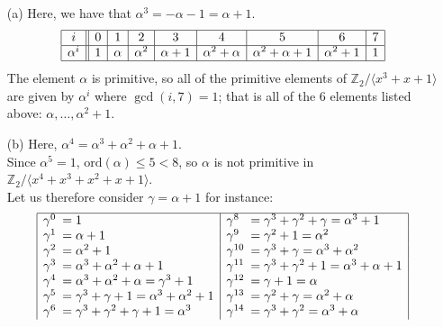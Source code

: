 \documentclass[11pt]{article}
\begin{document}
\newpage{}
\begin{itemize}
  \item[{(a)}] Here, we have that $\alpha^3 = -\alpha-1 = \alpha+1$.
  \[\begin{array}{|c||c|c|c|c|c|c|c|c|}\hline
           i &  0  &    1   &    2     &    3     &    4            &             5     &    6       &  7\\\hline
    \alpha^i &  1  & \alpha & \alpha^2 & \alpha+1 & \alpha^2+\alpha & \alpha^2+\alpha+1 & \alpha^2+1 &  1\\\hline
  \end{array}\]
    The element $\alpha$ is primitive, so all of the primitive elements of $\mathbb{Z}_2/\langle x^3+x+1\rangle$
    are given by $\alpha^i$ where $\gcd(i,7) = 1$; that is all of the 6 elements listed above: $\alpha,\ldots,\alpha^2+1$.
  \item[{(b)}] Here, $\alpha^4 = \alpha^3+\alpha^2+\alpha+1$.
  \\Since $\alpha^5 = 1$, $\text{ord}(\alpha)\leq 5<8$, so $\alpha$ is not primitive in $\mathbb{Z}_2/\langle x^4+x^3+x^2+x+1\rangle$.
  \\Let us therefore consider $\gamma = \alpha + 1$ for instance:
  \[\begin{array}{|ll|ll|}\hline\begin{picture}(0,0)(0,.7)\end{picture}
    \gamma^0 \!\!\!&= 1                                               & \gamma^8   \!\!\!&= \gamma^3 + \gamma^2 + \gamma = \alpha^3 + 1 \\
    \gamma^1 \!\!\!&= \alpha + 1                                      & \gamma^9   \!\!\!&= \gamma^2 + 1 = \alpha^2 \\
    \gamma^2 \!\!\!&= \alpha^2+1                                      & \gamma^{10}\!\!\!&= \gamma^3 + \gamma = \alpha^3 + \alpha^2 \\
    \gamma^3 \!\!\!&= \alpha^3 + \alpha^2 + \alpha + 1                & \gamma^{11}\!\!\!&= \gamma^3 + \gamma^2 + 1 = \alpha^3 + \alpha + 1\\
    \gamma^4 \!\!\!&= \alpha^3 + \alpha^2 + \alpha = \gamma^3 + 1     & \gamma^{12}\!\!\!&= \gamma + 1 = \alpha \\
    \gamma^5 \!\!\!&= \gamma^3 + \gamma + 1 = \alpha^3 + \alpha^2 + 1 & \gamma^{13}\!\!\!&= \gamma^2 + \gamma = \alpha^2 + \alpha \\
    \gamma^6 \!\!\!&= \gamma^3 + \gamma^2 + \gamma + 1 = \alpha^3     & \gamma^{14}\!\!\!&= \gamma^3 + \gamma^2 = \alpha^3 + \alpha\\

\end{array}\]
\end{itemize}
\end{document}

